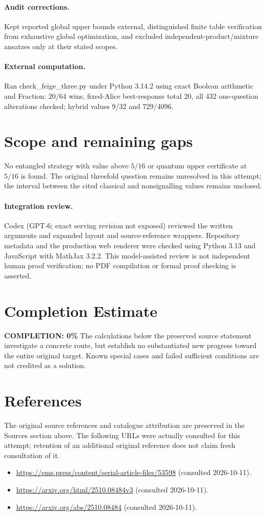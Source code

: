 \documentclass[11pt]{article}
\begin{document}
\paragraph{Audit corrections.} Kept reported global upper bounds external, distinguished finite table verification from exhaustive global optimization, and excluded independent-product/mixture ansatzes only at their stated scopes.
\paragraph{External computation.} Ran check_feige_three.py under Python 3.14.2 using exact Boolean arithmetic and Fraction: 20/64 wins, fixed-Alice best-response total 20, all 432 one-question alterations checked; hybrid values 9/32 and 729/4096.
\section{Scope and remaining gaps}
No entangled strategy with value above $5/16$ or quantum upper certificate at $5/16$ is found. The original threefold question remains unresolved in this attempt; the interval between the cited classical and nonsignalling values remains unclosed.
\paragraph{Integration review.} Codex (GPT-6; exact serving revision not exposed) reviewed the written arguments and expanded layout and source-reference wrappers. Repository metadata and the production web renderer were checked using Python 3.13 and JavaScript with MathJax 3.2.2. This model-assisted review is not independent human proof verification; no PDF compilation or formal proof checking is asserted.

\section{Completion Estimate}
\noindent\textbf{COMPLETION: 0\%}
The calculations below the preserved source statement investigate a concrete route,
but establish no substantiated new progress toward the entire original target.
Known special cases and failed sufficient conditions are not credited as a solution.
\section{References}
The original source references and catalogue attribution are preserved in the
Sources section above. The following URLs were actually consulted for this attempt;
retention of an additional original reference does not claim fresh consultation of it.
\begin{itemize}
\item \url{https://ems.press/content/serial-article-files/53598} (consulted 2026-10-11). 
\item \url{https://arxiv.org/html/2510.08484v3} (consulted 2026-10-11). 
\item \url{https://arxiv.org/abs/2510.08484} (consulted 2026-10-11). 
\end{itemize}
\end{document}
